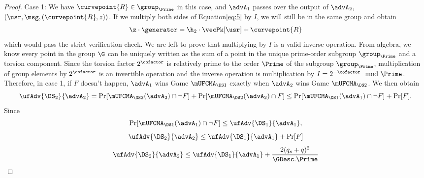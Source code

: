 \begin{proof}
		Case 1: We have $\curvepoint{R} \in \group_{\Prime}$ in this case, and $\advA_1$ passes over the output of $\advA_2$, $(\usr, \msg, (\curvepoint{R}, z))$.
		If we multiply both sides of Equation\eqref{eq:5} by $I$, we will still be in the same group and obtain
		\[\z \cdot  \generator = \h_2 \cdot \vecPk[\usr] + \curvepoint{R}\] which would pass the strict verification check. We are left to prove that multiplying by $I$ is a valid inverse operation. From algebra, we know every point in the group $\G$ can be uniquely written as the sum of a point in the unique prime-order subgroup $\group_{\Prime}$ and a torsion component. Since the torsion factor $2^\cofactor$ is relatively prime to the order $\Prime$ of the subgroup $\group_{\Prime}$, multiplication of group elements by $2^\cofactor$ is an invertible operation and the inverse operation is multiplication by $I = 2^{-\cofactor} \mod \Prime$. 
		Therefore, in case 1, if $F$ doesn't happen, $\advA_1$ wins Game $\mUFCMA_{\DS1}$ exactly when $\advA_2$ wins Game $\mUFCMA_{\DS2}$. We then obtain
		\[\ufAdv{\DS_2}{\advA_2} = \Pr[\mUFCMA_{\DS2}(\advA_2) \cap \neg F] +  \Pr[\mUFCMA_{\DS2}(\advA_2) \cap F] \leq \Pr[\mUFCMA_{\DS1}(\advA_1) \cap \neg F] + \Pr[F] .\] 
		Since 
		\[ \Pr[\mUFCMA_{\DS1}(\advA_1) \cap \neg F] \leq \ufAdv{\DS_1}{\advA_1} ,\]
		\[\ufAdv{\DS_2}{\advA_2} \leq \ufAdv{\DS_1}{\advA_1} + \Pr[F]\]
		\[\ufAdv{\DS_2}{\advA_2} \leq \ufAdv{\DS_1}{\advA_1} +  \frac{2(q_s + q)^2}{\GDesc.\Prime}\]
		

\end{proof}
